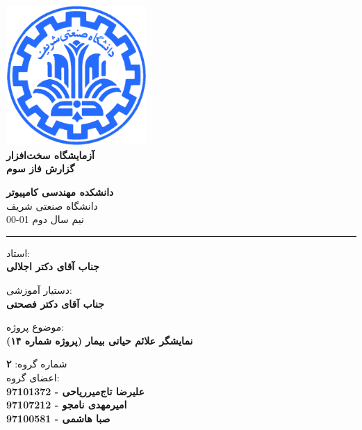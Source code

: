 \documentclass[12pt]{article}
\begin{document}
\begin{titlepage}
\begin{center}
        
\vspace*{0.7cm}

\includegraphics[width=0.4\textwidth]{sharif1.png}\\
\vspace{0.5cm}
\textbf{ \Huge{\emph ‌آزمایشگاه سخت‌افزار} }\\
\vspace{0.5cm}
\textbf{ \Large{گزارش فاز سوم} }
\vspace{0.2cm}
       
 
      \large \textbf{دانشکده مهندسی کامپیوتر}\\\vspace{0.2cm}
    \large   دانشگاه صنعتی شریف\\\vspace{0.2cm}
       \large   ﻧﯿﻢ سال دوم 01-00 \\\vspace{0.2cm}
      \noindent\rule[1ex]{\linewidth}{1pt}
استاد:\\
    \textbf{{جناب آقای دکتر اجلالی}}


دستیار آموزشی:\\
\textbf{{جناب آقای دکتر فصحتی}}

    \vspace{0.25cm}
    
    موضوع پروژه:\\
    
    \textbf{{نمایشگر علائم حیاتی بیمار (پروژه شماره ۱۴)}}
    
    \vspace{0.35cm}
    
    
        شماره گروه:
    \textbf{{۲}}\\
    
اعضای گروه:\\

    \textbf{{علیرضا تاج‌میرریاحی - 97101372}}
    \\
   
     \textbf{{امیرمهدی نامجو - 97107212}}   
   \\
   
    \textbf{{ صبا هاشمی - 97100581}}
\end{center}
\end{titlepage}
\end{document}
